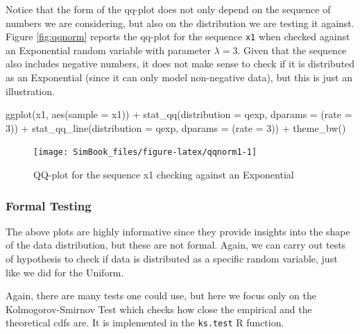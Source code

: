 \documentclass[
]{book}
\newenvironment{Shaded}{\begin{snugshade}}{\end{snugshade}}
\newcommand{\AttributeTok}[1]{\textcolor[rgb]{0.77,0.63,0.00}{#1}}
\newcommand{\DecValTok}[1]{\textcolor[rgb]{0.00,0.00,0.81}{#1}}
\newcommand{\FunctionTok}[1]{\textcolor[rgb]{0.00,0.00,0.00}{#1}}
\newcommand{\NormalTok}[1]{#1}
\newcommand{\SpecialCharTok}[1]{\textcolor[rgb]{0.00,0.00,0.00}{#1}}
\begin{document}
Notice that the form of the qq-plot does not only depend on the sequence of numbers we are considering, but also on the distribution we are testing it against. Figure \ref{fig:qqnorm} reports the qq-plot for the sequence \texttt{x1} when checked against an Exponential random variable with parameter \(\lambda =3\). Given that the sequence also includes negative numbers, it does not make sense to check if it is distributed as an Exponential (since it can only model non-negative data), but this is just an illustration.

\begin{Shaded}
\begin{Highlighting}[]
\FunctionTok{ggplot}\NormalTok{(x1, }\FunctionTok{aes}\NormalTok{(}\AttributeTok{sample =}\NormalTok{ x1)) }\SpecialCharTok{+}
   \FunctionTok{stat\_qq}\NormalTok{(}\AttributeTok{distribution =}\NormalTok{ qexp, }\AttributeTok{dparams =}\NormalTok{ (}\AttributeTok{rate =} \DecValTok{3}\NormalTok{)) }\SpecialCharTok{+}
   \FunctionTok{stat\_qq\_line}\NormalTok{(}\AttributeTok{distribution =}\NormalTok{ qexp, }\AttributeTok{dparams =}\NormalTok{ (}\AttributeTok{rate =} \DecValTok{3}\NormalTok{)) }\SpecialCharTok{+}
   \FunctionTok{theme\_bw}\NormalTok{()}
\end{Highlighting}
\end{Shaded}

\begin{figure}

{\centering \texttt{[image: SimBook\_files/figure-latex/qqnorm1-1]} 

}

\caption{QQ-plot for the sequence x1 checking against an Exponential}\label{fig:qqnorm1}
\end{figure}

\hypertarget{formal-testing}{%
\subsubsection{Formal Testing}\label{formal-testing}}

The above plots are highly informative since they provide insights into the shape of the data distribution, but these are not formal. Again, we can carry out tests of hypothesis to check if data is distributed as a specific random variable, just like we did for the Uniform.

Again, there are many tests one could use, but here we focus only on the Kolmogorov-Smirnov Test which checks how close the empirical and the theoretical cdfs are. It is implemented in the \texttt{ks.test} R function.
\end{document}
